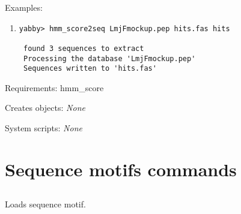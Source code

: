 \begin{description}
\item{Examples:}
\begin{enumerate}

\item
\begin{verbatim}
yabby> hmm_score2seq LmjFmockup.pep hits.fas hits

 found 3 sequences to extract
 Processing the database 'LmjFmockup.pep'
 Sequences written to 'hits.fas'

\end{verbatim}

\end{enumerate}


\item{Requirements:} hmm\_score


\item{Creates objects:} {\em None}


\item{System scripts:} {\em None}

\end{description}


\section{Sequence motifs commands}


\subsection[motif\_load]{  }



Loads sequence motif.


